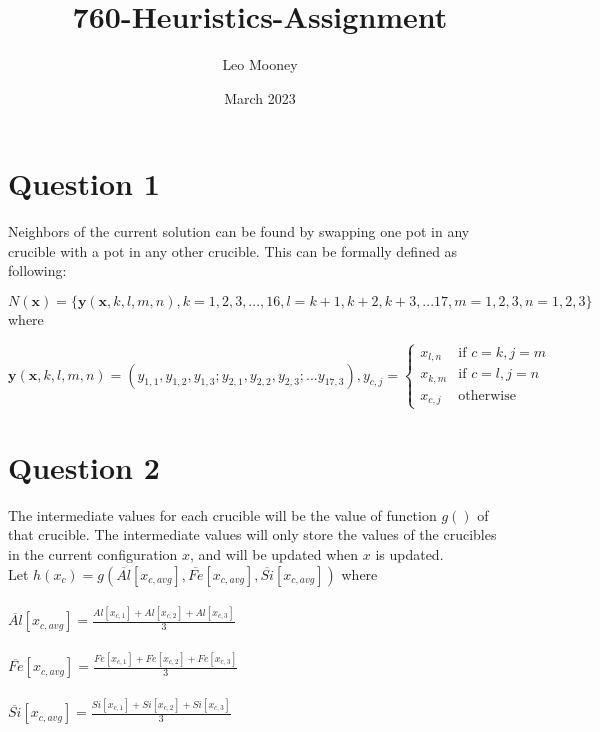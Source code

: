 \documentclass{article}
\title{760-Heuristics-Assignment}
\author{Leo Mooney}
\date{March 2023}
\begin{document}
\maketitle

\section{Question 1}
Neighbors of the current solution can be found by swapping one pot in
any crucible with a pot in any other crucible.
This can be formally defined as following:

$N(\mathbf{x}) = \{\mathbf{y}(\mathbf{x}, k, l, m, n), k=1,2,3,...,16, 
l=k+1,k+2,k+3,...17, m=1,2,3, n=1,2,3\}$ where

$$\mathbf{y}(\mathbf{x},k,l,m,n)=(y_{1, 1},y_{1, 2},y_{1, 3};
y_{2, 1},y_{2, 2},y_{2, 3};...y_{17, 3}),y_{c,j}=
\begin{cases}
    x_{l, n} & \text{if } c=k,j=m \\
    x_{k, m} & \text{if } c=l,j=n \\
    x_{c,j} & \text{otherwise}
\end{cases}$$

\clearpage
\section{Question 2}
The intermediate values for each crucible will be the value of function
$g()$ of that crucible. The intermediate values will only store the
values of the crucibles in the current configuration $x$, and will be 
updated when $x$ is updated.\\

Let $h(x_c) = g(\overline{Al}[x_{c,avg}], \overline{Fe}[x_{c,avg}], \overline{Si}[x_{c, avg}])$ where \\\\
$\overline{Al}[x_{c,avg}] = \displaystyle\frac{Al[x_{c,1}]+Al[x_{c,2}]+Al[x_{c,3}]}{3}$\\\\
$\overline{Fe}[x_{c,avg}] = \displaystyle\frac{Fe[x_{c,1}]+Fe[x_{c,2}]+Fe[x_{c,3}]}{3}$\\\\
$\overline{Si}[x_{c,avg}] = \displaystyle\frac{Si[x_{c,1}]+Si[x_{c,2}]+Si[x_{c,3}]}{3}$
\end{document}
